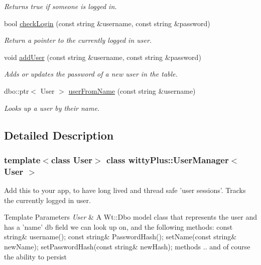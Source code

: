 \begin{DoxyCompactItemize}
\begin{DoxyCompactList}\small\item\em Returns true if someone is logged in. \item\end{DoxyCompactList}\item 
bool \hyperlink{classwittyPlus_1_1UserManager_a240024bf2761fe33ef965b33db187832}{checkLogin} (const string \&username, const string \&password)
\begin{DoxyCompactList}\small\item\em Return a pointer to the currently logged in user. \item\end{DoxyCompactList}\item 
void \hyperlink{classwittyPlus_1_1UserManager_a8abad96b33630a62e8737f0de803f06d}{addUser} (const string \&username, const string \&password)
\begin{DoxyCompactList}\small\item\em Adds or updates the password of a new user in the table. \item\end{DoxyCompactList}\item 
dbo::ptr$<$ User $>$ \hyperlink{classwittyPlus_1_1UserManager_af60bbfbe3ea60a766cdcc66673ae39dc}{userFromName} (const string \&username)
\begin{DoxyCompactList}\small\item\em Looks up a user by their name. \item\end{DoxyCompactList}\end{DoxyCompactItemize}


\subsection{Detailed Description}
\subsubsection*{template$<$class User$>$ class wittyPlus::UserManager$<$ User $>$}

Add this to your app, to have long lived and thread safe 'user sessions'. Tracks the currently logged in user.


\begin{DoxyTemplParams}{Template Parameters}
{\em User} & A Wt::Dbo model class that represents the user and has a 'name' db field we can look up on, and the following methods: const string\& username(); const string\& PasswordHash(); setName(const string\& newName); setPasswordHash(const string\& newHash); methods .. and of course the ability to persist \\
\hline
\end{DoxyTemplParams}


